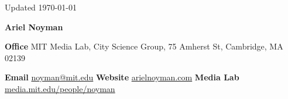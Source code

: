 \documentclass[10pt,letterpaper]{report}
\newcommand{\myname}{Ariel Noyman}
\newcommand{\namefont}[1]{{\lsstyle\Huge\bfseries{#1}}}
\begin{document}
\begin{center}
    \vfill
    \small {Updated \monthyeardate\today}
\end{center}
\vspace{2em}

\raggedright
\namefont{\myname}
\newline

\vspace{3em}

\begin{minipage}{0.4\linewidth}
    \textbf{Office} MIT Media Lab, City Science Group,
    75 Amherst St, Cambridge, MA 02139
\end{minipage}
\hfill
\begin{minipage}{0.5\linewidth}
    \textbf{Email} \href{mailto:noyman@mit.edu}{noyman@mit.edu}
    \newline
    \textbf{Website} \href{http://www.arielnoyman.com/}{arielnoyman.com}
    \newline
    \textbf{Media Lab} \href{https://www.media.mit.edu/people/noyman/overview/}{media.mit.edu/people/noyman}

\end{minipage}













\end{document}
